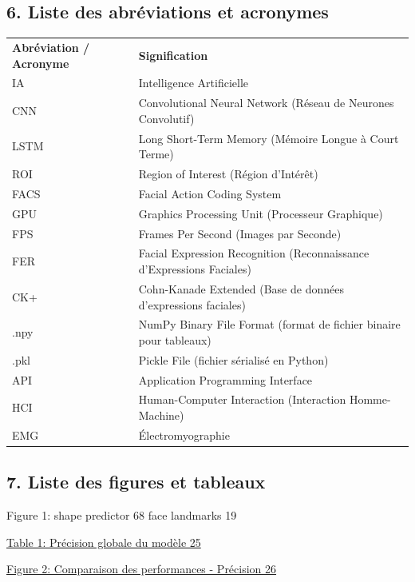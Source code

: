 \documentclass[
]{article}
\begin{document}
\hypertarget{liste-des-abruxe9viations-et-acronymes}{%
\subsection{6. Liste des abréviations et acronymes}\label{liste-des-abruxe9viations-et-acronymes}}

\begin{longtable}[]{@{}ll@{}}
\toprule
\endhead
\textbf{Abréviation / Acronyme}{} & \textbf{Signification} \\
IA & Intelligence Artificielle \\
CNN & Convolutional Neural Network (Réseau de Neurones Convolutif) \\
LSTM & Long Short-Term Memory (Mémoire Longue à Court Terme) \\
ROI & Region of Interest (Région d'Intérêt) \\
FACS & Facial Action Coding System \\
GPU & Graphics Processing Unit (Processeur Graphique) \\
FPS & Frames Per Second (Images par Seconde) \\
FER & Facial Expression Recognition (Reconnaissance d'Expressions Faciales) \\
CK+ & Cohn-Kanade Extended (Base de données d'expressions faciales) \\
.npy & NumPy Binary File Format (format de fichier binaire pour tableaux) \\
.pkl & Pickle File (fichier sérialisé en Python) \\
API & Application Programming Interface \\
HCI & Human-Computer Interaction (Interaction Homme-Machine) \\
EMG & Électromyographie \\
\bottomrule
\end{longtable}

\hypertarget{liste-des-figures-et-tableaux}{%
\subsection{7. Liste des figures et tableaux}\label{liste-des-figures-et-tableaux}}

Figure 1: shape predictor 68 face landmarks 19

\href{/l}{Table 1: Précision globale du modèle 25}

\href{/l}{Figure 2: Comparaison des performances - Précision 26}
\end{document}
